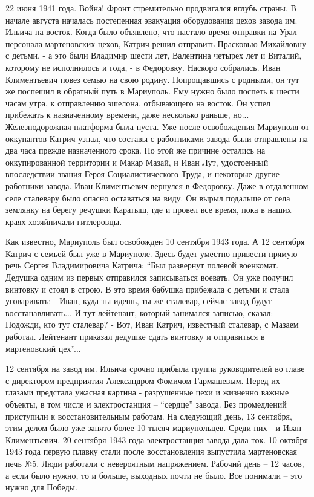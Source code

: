 22 июня 1941 года. Война! Фронт стремительно продвигался вглубь страны. В
начале августа началась постепенная эвакуация оборудования цехов завода им.
Ильича на восток. Когда было объявлено, что настало время отправки на Урал
персонала мартеновских цехов, Катрич решил отправить Прасковью Михайловну с
детьми, - а это были Владимир шести лет, Валентина четырех лет  и Виталий,
которому не исполнилось и года, - в Федоровку.  Наскоро собрались. Иван
Климентьевич повез семью на свою родину. Попрощавшись с родными, он тут же
поспешил в обратный путь в Мариуполь. Ему нужно было поспеть к шести часам
утра, к отправлению эшелона, отбывающего на восток. Он успел прибежать к
назначенному времени, даже несколько раньше, но...  Железнодорожная  платформа
была пуста. Уже после освобождения Мариуполя от оккупантов Катрич узнал, что
составы с работниками завода были отправлены на два часа прежде назначенного
срока.  По этой же причине остались на оккупированной территории и Макар Мазай,
и Иван Лут, удостоенный впоследствии звания Героя Социалистического Труда, и
некоторые другие работники завода. Иван Климентьевич вернулся в Федоровку. Даже
в отдаленном селе сталевару было опасно оставаться на виду. Он вырыл подальше
от села землянку на берегу речушки Каратыш, где и провел все время, пока в
наших краях хозяйничали гитлеровцы.

Как известно, Мариуполь был освобожден 10 сентября 1943 года. А 12 сентября
Катрич с семьей был уже в Мариуполе. Здесь будет уместно привести прямую речь
Сергея Владимировича Катрича: \enquote{Был развернут полевой военкомат. Дедушка одним
из первых отправился записываться воевать. Он уже получил винтовку и стоял в
строю. В это время бабушка прибежала с детьми и стала уговаривать: - Иван, куда
ты идешь, ты же сталевар, сейчас завод будут восстанавливать... И тут лейтенант,
который занимался записью, сказал: - Подожди, кто тут сталевар? - Вот, Иван
Катрич, известный сталевар, с Мазаем работал.  Лейтенант приказал дедушке сдать
винтовку и отправиться в мартеновский цех}... 

12 сентября на завод им. Ильича срочно прибыла группа руководителей во главе с
директором предприятия Александром Фомичом Гармашевым. Перед их глазами
предстала ужасная  картина - разрушенные цехи и жизненно важные объекты, в том
числе и электростанция – \enquote{сердце} завода. Без промедлений приступили к
восстановительным работам. На следующий день, 13 сентября, этим делом было уже
занято более 10 тысяч мариупольцев.  Среди них - и Иван Климентьевич. 20
сентября  1943 года электростанция завода дала ток. 10 октября 1943 года первую
плавку стали после восстановления выпустила мартеновская печь №5. Люди работали
с невероятным напряжением. Рабочий день – 12 часов, а если было нужно, то и
больше, выходных почти не было. Все понимали – это нужно для Победы.

